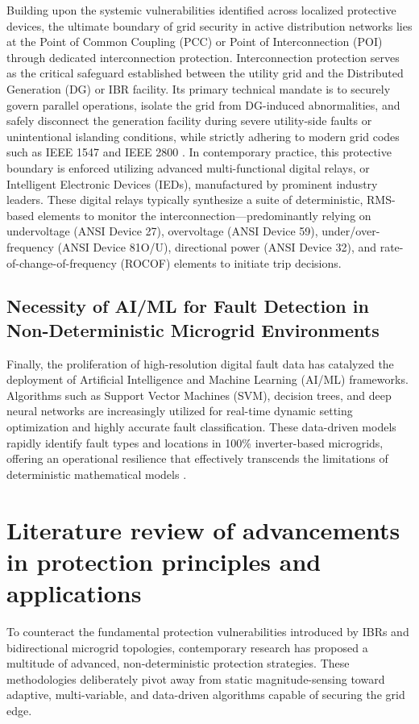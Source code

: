 Building upon the systemic vulnerabilities identified across localized protective devices, the ultimate boundary of grid security in active distribution networks lies at the Point of Common Coupling (PCC) or Point of Interconnection (POI) through dedicated interconnection protection. Interconnection protection serves as the critical safeguard established between the utility grid and the Distributed Generation (DG) or IBR facility. Its primary technical mandate is to securely govern parallel operations, isolate the grid from DG-induced abnormalities, and safely disconnect the generation facility during severe utility-side faults or unintentional islanding conditions, while strictly adhering to modern grid codes such as IEEE 1547 and IEEE 2800 \cite{ieeestandard2022}. In contemporary practice, this protective boundary is enforced utilizing advanced multi-functional digital relays, or Intelligent Electronic Devices (IEDs), manufactured by prominent industry leaders. These digital relays typically synthesize a suite of deterministic, RMS-based elements to monitor the interconnection—predominantly relying on undervoltage (ANSI Device 27), overvoltage (ANSI Device 59), under/over-frequency (ANSI Device 81O/U), directional power (ANSI Device 32), and rate-of-change-of-frequency (ROCOF) elements to initiate trip decisions.

\subsection{Necessity of AI/ML for Fault Detection in Non-Deterministic Microgrid Environments}
Finally, the proliferation of high-resolution digital fault data has catalyzed the deployment of Artificial Intelligence and Machine Learning (AI/ML) frameworks. Algorithms such as Support Vector Machines (SVM), decision trees, and deep neural networks are increasingly utilized for real-time dynamic setting optimization and highly accurate fault classification. These data-driven models rapidly identify fault types and locations in 100\% inverter-based microgrids, offering an operational resilience that effectively transcends the limitations of deterministic mathematical models \cite{ml_microgrid_2024}.

\section{Literature review of advancements in protection principles and applications}

To counteract the fundamental protection vulnerabilities introduced by IBRs and bidirectional microgrid topologies, contemporary research has proposed a multitude of advanced, non-deterministic protection strategies. These methodologies deliberately pivot away from static magnitude-sensing toward adaptive, multi-variable, and data-driven algorithms capable of securing the grid edge.

